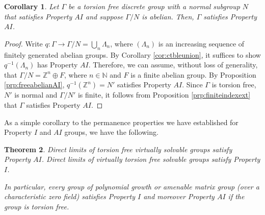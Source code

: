 \documentclass[a4paper, 12pt]{amsart}
\newtheorem{thm}{Theorem}[section]
\newtheorem{cor}[thm]{Corollary}
\theoremstyle{definition}
\theoremstyle{remark}
\numberwithin{equation}{section}
\begin{document}
\begin{cor}
\label{cor:abelianAI}
    Let $\Gamma$ be a torsion free discrete group with a normal subgroup $N$ that satisfies Property $AI$ and suppose $\Gamma/N$ is abelian. Then, $\Gamma$ satisfies Property $AI$.
\end{cor}

\begin{proof}
    Write $q:\Gamma\to \Gamma/N = \bigcup_{n}\Lambda_{n}$, where $(\Lambda_{n})$ is an increasing sequence of finitely generated abelian groups. By Corollary \ref{cor:ctbleunion}, it suffices to show $q^{-1}(\Lambda_{n})$ has Property $AI$. Therefore, we can assume, without loss of generality, that $\Gamma/N = \mathbb{Z}^{n}\oplus F$, where $n\in\mathbb{N}$ and $F$ is a finite abelian group. By Proposition \ref{prp:freeabelianAI}, $q^{-1}(\mathbb{Z}^{n}) = N'$ satisfies Property $AI$. Since $\Gamma$ is torsion free, $N'$ is normal and $\Gamma/N'$ is finite, it follows from Proposition \ref{prp:finiteindexext} that $\Gamma$ satisfies Property $AI$. 
\end{proof}

As a simple corollary to the permanence properties we have established for Property $I$ and $AI$ groups, we have the following.

\begin{thm}
\label{thm:propertyAI&I}
    Direct limits of torsion free virtually solvable groups satisfy Property $AI$. Direct limits of virtually torsion free solvable groups satisfy Property $I$. 
    
    In particular, every group of polynomial growth or amenable matrix group (over a characteristic zero field) satisfies Property $I$ and moreover Property $AI$ if the group is torsion free.
\end{thm}
\end{document}
